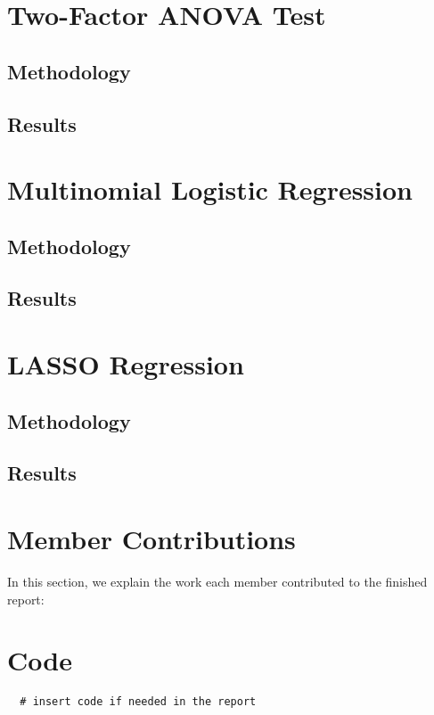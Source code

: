 \documentclass{article}
\begin{document}
\newpage

\section{Two-Factor ANOVA Test}

\subsection{Methodology}

\subsection{Results}

\newpage

\section{Multinomial Logistic Regression}

\subsection{Methodology}

\subsection{Results}

\newpage

\section{LASSO Regression}

\subsection{Methodology}

\subsection{Results}

\newpage
\section{Member Contributions}
In this section, we explain the work each member contributed to the finished report:\linebreak

\newpage
\appendix
\section{Code}
\begin{verbatim}
  # insert code if needed in the report
  
\end{verbatim}
\end{document}
